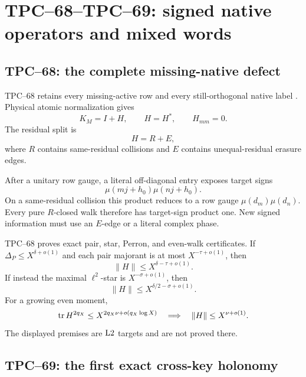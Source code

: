 \section{TPC--68--TPC--69: signed native operators and mixed words}
\label{sec:native-mixed}

\subsection{TPC--68: the complete missing-native defect}

TPC--68 retains every missing-active row and every still-orthogonal native
label \citep{WangTPC68}.  Physical atomic normalization gives
\begin{equation}
 K_M=I+H,
 \qquad
 H=H^*,
 \qquad
 H_{mm}=0.
 \label{eq:tpc72-native-gram}
\end{equation}
The residual split is
\[
 H=R+E,
\]
where \(R\) contains same-residual collisions and \(E\) contains
unequal-residual erasure edges.

After a unitary row gauge, a literal off-diagonal entry exposes target signs
\[
 \mu(mj+h_0)\mu(nj+h_0).
\]
On a same-residual collision this product reduces to a row gauge
\(\mu(d_m)\mu(d_n)\).  Every pure \(R\)-closed walk therefore has target-sign
product one.  New signed information must use an \(E\)-edge or a literal
complex phase.

TPC--68 proves exact pair, star, Perron, and even-walk certificates.  If
\(\Delta_P\le X^{\delta+o(1)}\) and each pair majorant is at most
\(X^{-\tau+o(1)}\), then
\begin{equation}
 \|H\|\le X^{\delta-\tau+o(1)}.
 \label{eq:tpc72-pair-route}
\end{equation}
If instead the maximal \(\ell^2\)-star is
\(X^{-\sigma+o(1)}\), then
\begin{equation}
 \|H\|\le X^{\delta/2-\sigma+o(1)}.
 \label{eq:tpc72-star-route}
\end{equation}
For a growing even moment,
\begin{equation}
 \operatorname{tr} H^{2q_X}
 \le
 X^{2q_X\nu+o(q_X\log X)}
 \quad\Longrightarrow\quad
 \|H\|\le X^{\nu+o(1)}.
 \label{eq:tpc72-walk-route}
\end{equation}
The displayed premises are \(\mathrm{L2}\) targets and are not proved there.

\subsection{TPC--69: the first exact cross-key holonomy}


